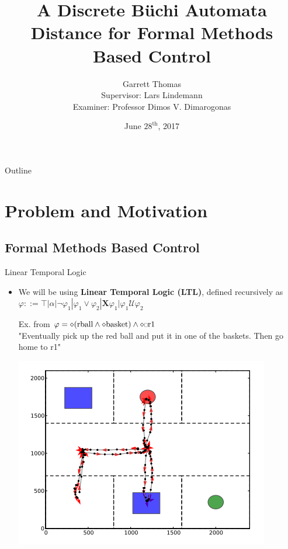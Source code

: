 \documentclass{beamer}
\title[Master's Thesis Presentation]{A Discrete B\"uchi Automata Distance for Formal Methods Based Control}
\author[Garrett Thomas]{{\Large Garrett Thomas} \\
\small Supervisor: Lars Lindemann \\
Examiner: Professor Dimos V. Dimarogonas}
\institute[KTH] %
{
  Automatic Control Department \\
  Royal Institute of Technology, KTH
}
\date{June $28^{\text{th}}$, 2017}
\newcommand{\ssquare}{\text{\scalebox{0.6}{$\square$}}}
\begin{document}
\begin{frame}
  \titlepage
\end{frame}

\begin{frame}{Outline}
  \tableofcontents
\end{frame}

\section{Problem and Motivation}

\subsection{Formal Methods Based Control}

\begin{frame}{Linear Temporal Logic}

  \begin{itemize}
  \item {
    We will be using \textbf{Linear Temporal Logic (LTL)}, defined recursively as
    $\varphi ::= \top | \alpha | \neg \varphi_1 | \varphi_1  \lor \varphi_2 | \textbf{X} \varphi_1 | \varphi_1 \bm{\mathcal{U}} \varphi_2$
    \pause
  }
	\begin{exampleblock}{Ex. from \cite{guo15}}
$ \varphi= \diamond(\text{rball} \land \diamond \text{basket}) \land \diamond \ssquare \text{r1}$ \\
    "Eventually pick up the red ball and put it in one of the baskets. Then go home to r1"
\end{exampleblock}    

     \centering\includegraphics[scale=0.3]{ltlExampleWorkspace}\par
  \end{itemize}
\end{frame}
\end{document}
